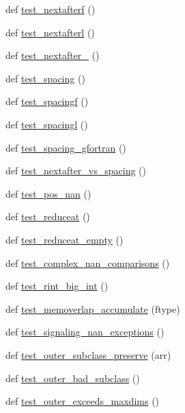 \begin{DoxyCompactItemize}
def \hyperlink{namespacenumpy_1_1core_1_1tests_1_1test__umath_aaf7615ca8a37906f488ddd157639a44b}{test\+\_\+nextafterf} ()
\item 
def \hyperlink{namespacenumpy_1_1core_1_1tests_1_1test__umath_a92fd193d8f7c569a8d5a14c22a1a04f2}{test\+\_\+nextafterl} ()
\item 
def \hyperlink{namespacenumpy_1_1core_1_1tests_1_1test__umath_a389b54b490ff24a45300fe381a37239c}{test\+\_\+nextafter\+\_} ()
\item 
def \hyperlink{namespacenumpy_1_1core_1_1tests_1_1test__umath_a459ddc1621a58107b954f3e2ab9b68d5}{test\+\_\+spacing} ()
\item 
def \hyperlink{namespacenumpy_1_1core_1_1tests_1_1test__umath_a8f645242192f37c5945a7134a7620cf2}{test\+\_\+spacingf} ()
\item 
def \hyperlink{namespacenumpy_1_1core_1_1tests_1_1test__umath_a91567f750c9815c4f717288b169891b0}{test\+\_\+spacingl} ()
\item 
def \hyperlink{namespacenumpy_1_1core_1_1tests_1_1test__umath_ae35dbc2592a0570f6c4e1c0b872d12b0}{test\+\_\+spacing\+\_\+gfortran} ()
\item 
def \hyperlink{namespacenumpy_1_1core_1_1tests_1_1test__umath_a1cdbd5cbfc5ebd12dbf7d30720ad1a8b}{test\+\_\+nextafter\+\_\+vs\+\_\+spacing} ()
\item 
def \hyperlink{namespacenumpy_1_1core_1_1tests_1_1test__umath_a08485b1a12de6479a4694d4c2c9075d2}{test\+\_\+pos\+\_\+nan} ()
\item 
def \hyperlink{namespacenumpy_1_1core_1_1tests_1_1test__umath_ac23e2acacae15699c2572ba4431bdd34}{test\+\_\+reduceat} ()
\item 
def \hyperlink{namespacenumpy_1_1core_1_1tests_1_1test__umath_a3a8ec3be5a271dd80e033aea3e179665}{test\+\_\+reduceat\+\_\+empty} ()
\item 
def \hyperlink{namespacenumpy_1_1core_1_1tests_1_1test__umath_aa321d51da6cd88aaff8eead09988c8f0}{test\+\_\+complex\+\_\+nan\+\_\+comparisons} ()
\item 
def \hyperlink{namespacenumpy_1_1core_1_1tests_1_1test__umath_af616d876bb68fd6010e13520f2ad5bc4}{test\+\_\+rint\+\_\+big\+\_\+int} ()
\item 
def \hyperlink{namespacenumpy_1_1core_1_1tests_1_1test__umath_a6daff927c822d3baca7dda9bcec5cdc9}{test\+\_\+memoverlap\+\_\+accumulate} (ftype)
\item 
def \hyperlink{namespacenumpy_1_1core_1_1tests_1_1test__umath_a796d7974e48867358e9570d47eebf9b2}{test\+\_\+signaling\+\_\+nan\+\_\+exceptions} ()
\item 
def \hyperlink{namespacenumpy_1_1core_1_1tests_1_1test__umath_a944f01d46d673f3bbced22f4bd41ed76}{test\+\_\+outer\+\_\+subclass\+\_\+preserve} (arr)
\item 
def \hyperlink{namespacenumpy_1_1core_1_1tests_1_1test__umath_a467f19f72daafabd2517a6045f685b69}{test\+\_\+outer\+\_\+bad\+\_\+subclass} ()
\item 
def \hyperlink{namespacenumpy_1_1core_1_1tests_1_1test__umath_aa15ac84065e64019c596cc99b2b1b91b}{test\+\_\+outer\+\_\+exceeds\+\_\+maxdims} ()
\end{DoxyCompactItemize}
